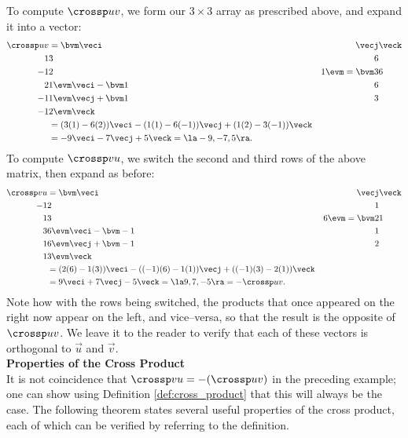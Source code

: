 {To compute $\crossp uv$, we form our $3\times 3$ array as prescribed above, and expand it into a vector:
\begin{align*}
\crossp uv &= \bvm \veci & \vecj & \veck\\ 1& 3& 6\\ -1& 2& 1\evm = \bvm 3& 6\\2 &1\evm \veci - \bvm 1 & 6\\ -1& 1\evm\vecj +\bvm 1& 3\\ -1 & 2\evm\veck\\
		& = (3(1)-6(2))\veci -(1(1)-6(-1))\vecj + (1(2)-3(-1))\veck\\
		& = -9\veci-7\vecj+5\veck = \la -9, -7, 5\ra.
\end{align*}
To compute $\crossp vu$, we switch the second and third rows of the above matrix, then expand as before:
\begin{align*}
\crossp vu & = \bvm \veci & \vecj& \veck\\ -1 & 2& 1\\ 1& 3& 6\evm = \bvm 2 &1\\3 &6\evm\veci - \bvm -1& 1\\ 1& 6\evm\vecj + \bvm -1& 2\\ 1 &3\evm\veck\\
		   & = (2(6)-1(3))\veci-((-1)(6)-1(1))\vecj + ((-1)(3)-2(1))\veck\\
		   & = 9\veci+7\vecj -5\veck = \la 9, 7, -5\ra = -\crossp uv.
\end{align*}
Note how with the rows being switched, the products that once appeared on the right now appear on the left, and vice--versa, so that the result is the opposite of $\crossp uv$. We leave it to the reader to verify that each of these vectors is orthogonal to $\vec u$ and $\vec v$.
}\\

\noindent\textbf{\large Properties of the Cross Product}\\

It is not coincidence that $\crossp vu = -(\crossp uv)$ in the preceding example; one can show using Definition \ref{def:cross_product} that this will always be the case. The following theorem states several useful properties of the cross product, each of which can be verified by referring to the definition.

